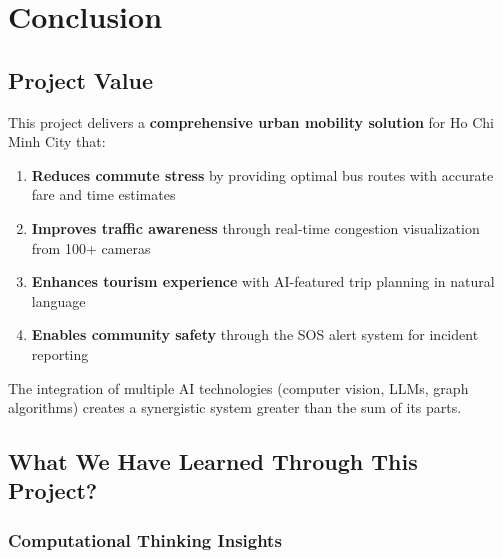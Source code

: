 \chapter{Conclusion}
\label{chap:conclusion}

\section{Project Value}

This project delivers a \textbf{comprehensive urban mobility solution} for Ho Chi Minh City that:

\begin{enumerate}
    \item \textbf{Reduces commute stress} by providing optimal bus routes with accurate fare and time estimates
    \item \textbf{Improves traffic awareness} through real-time congestion visualization from 100+ cameras
    \item \textbf{Enhances tourism experience} with AI-featured trip planning in natural language
    \item \textbf{Enables community safety} through the SOS alert system for incident reporting
\end{enumerate}

The integration of multiple AI technologies (computer vision, LLMs, graph algorithms) creates a synergistic system greater than the sum of its parts.

\section{What We Have Learned Through This Project?}

\subsection{Computational Thinking Insights}

